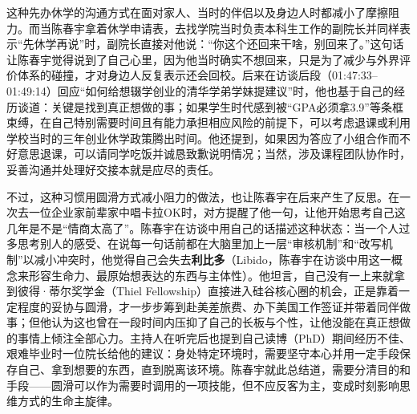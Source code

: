 \documentclass[UTF8,a4paper,11pt,fontset=fandol]{ctexart}
\begin{document}
这种先办休学的沟通方式在面对家人、当时的伴侣以及身边人时都减小了摩擦阻力。而当陈春宇拿着休学申请表，去找学院当时负责本科生工作的副院长并同样表示“先休学再说”时，副院长直接对他说：“你这个还回来干啥，别回来了。”这句话让陈春宇觉得说到了自己心里，因为他当时确实不想回来，只是为了减少与外界评价体系的碰撞，才对身边人反复表示还会回校。后来在访谈后段（01:47:33–01:49:14）回应“如何给想辍学创业的清华学弟学妹提建议”时，他也基于自己的经历谈道：关键是找到真正想做的事；如果学生时代感到被“GPA必须拿3.9”等条框束缚，在自己特别需要时间且有能力承担相应风险的前提下，可以考虑退课或利用学校当时的三年创业休学政策腾出时间。他还提到，如果因为答应了小组合作而不好意思退课，可以请同学吃饭并诚恳致歉说明情况；当然，涉及课程团队协作时，妥善沟通并处理好交接本就是应尽的责任。

不过，这种习惯用圆滑方式减小阻力的做法，也让陈春宇在后来产生了反思。在一次去一位企业家前辈家中唱卡拉OK时，对方提醒了他一句，让他开始思考自己这几年是不是“情商太高了”。陈春宇在访谈中用自己的话描述这种状态：当一个人过多思考别人的感受、在说每一句话前都在大脑里加上一层“审核机制”和“改写机制”以减小冲突时，他觉得自己会失去\textbf{利比多}（Libido，陈春宇在访谈中用这一概念来形容生命力、最原始想表达的东西与主体性）。他坦言，自己没有一上来就拿到彼得·蒂尔奖学金（Thiel Fellowship）直接进入硅谷核心圈的机会，正是靠着一定程度的妥协与圆滑，才一步步筹到赴美差旅费、办下美国工作签证并带着同伴做事；但他认为这也曾在一段时间内压抑了自己的长板与个性，让他没能在真正想做的事情上倾注全部心力。主持人在听完后也提到自己读博（PhD）期间经历不佳、艰难毕业时一位院长给他的建议：身处特定环境时，需要坚守本心并用一定手段保存自己、拿到想要的东西，直到脱离该环境。陈春宇就此总结道，需要分清目的和手段——圆滑可以作为需要时调用的一项技能，但不应反客为主，变成时刻影响思维方式的生命主旋律。
\end{document}
